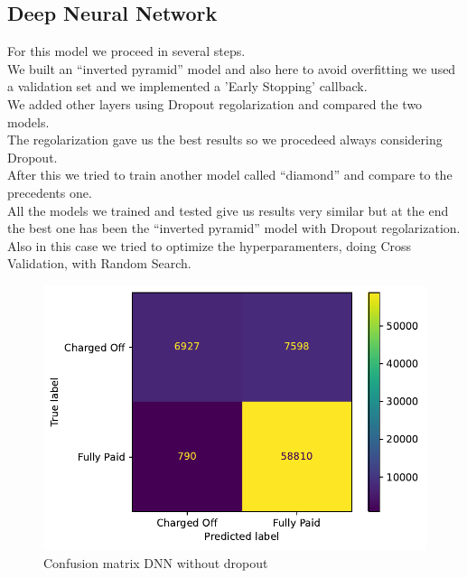 \documentclass[french]{scrartcl}
\begin{document}
\subsection{Deep Neural Network}
For this model we proceed in several steps.\\
We built an “inverted pyramid” model and also here to avoid overfitting we used a validation set and we implemented a ’Early Stopping’ callback. \\
We added other layers using Dropout regolarization and compared the two models.\\
The regolarization gave us the best results so we procedeed always considering Dropout.\\
After this we tried to train another model called “diamond” and compare to the precedents one. \\
All the models we trained and tested give us results very similar but at the end the best one has been the “inverted pyramid” model with Dropout regolarization.\\
Also in this case we tried to optimize the hyperparamenters, doing Cross Validation, with Random Search. 
	\begin{figure}[h!]
	\centering
	\includegraphics[scale=0.8]{figures/(7)confusion_matrix_basic_neural_network.pdf}
	\caption{Confusion matrix DNN without dropout}
\end{figure}
\end{document}
